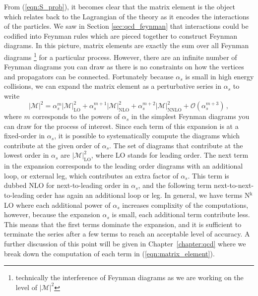 \documentclass[main.tex]{subfiles}
\begin{document}
    From (\ref{eqn:S_prob}), it becomes clear
    that the matrix element is the object which
    relates back to the Lagrangian of the theory
    as it encodes the interactions of the particles.
    We saw in Section \ref{sec:qcd_feynman} that
    interactions could be codified into Feynman
    rules which are pieced together to construct
    Feynman diagrams. In this picture, matrix elements
    are exactly the sum over all Feynman diagrams
    \footnote{technically the interference of
    Feynman diagrams as we are working on the level
    of $|\mathcal{M}|^{2}$}
    for a particular process. However, there are
    an infinite number of Feynman diagrams you can
    draw as there is no constraints on how the
    vertices and propagators can be connected.
    Fortunately because $\alpha_{s}$
    is small in high energy collisions, we can expand
    the matrix element as a perturbative series in
    $\alpha_{s}$ to write
    \begin{equation}\label{eqn:matrix_element}
        |\mathcal{M}|^{2} =  \alpha_{s}^{m} |\mathcal{M}|^{2}_{\mathrm{LO}} + \alpha_{s}^{m+1} |\mathcal{M}|^{2}_{\mathrm{NLO}} + \alpha_{s}^{m+2} |\mathcal{M}|^{2}_{\mathrm{NNLO}} + \mathcal{O}(\alpha_{s}^{m+3}) \, ,
    \end{equation}
    where $m$ corresponds to the powers of $\alpha_{s}$
    in the simplest Feynman diagrams you can draw
    for the process of interest.
    Since each term of this expansion is at a fixed-order
    in $\alpha_{s}$, it is possible to systematically
    compute the diagrams which contribute at the given order of $\alpha_{s}$.
    The set of diagrams that contribute at the lowest
    order in $\alpha_{s}$ are $|\mathcal{M}|^{2}_{\mathrm{LO}}$,
    where LO stands for leading order. The next term
    in the expansion corresponds to the leading order
    diagrams with an additional loop, or external leg,
    which contributes an extra factor of $\alpha_{s}$.
    This term is dubbed NLO for next-to-leading order
    in $\alpha_{s}$, and the following term
    next-to-next-to-leading order has again an additional
    loop or leg. In general, we have terms
    N$^{\mathrm{k}}$LO where each additional power of $\alpha_{s}$
    increases complixity of the computations, however,
    because the expansion $\alpha_{s}$
    is small, each additional term contribute less.
    This means that the first terms dominate the expansion,
    and it is sufficient to terminate the series after
    a few terms to reach an acceptable level of accuracy.
    A further discussion of this point will be given
    in Chapter~\ref{chapter:qcd} where we break down
    the computation of each term in (\ref{eqn:matrix_element}).
\end{document}
